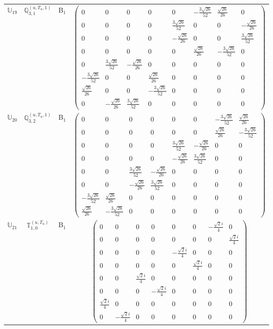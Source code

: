 \documentclass[fleqn,10pt,landscape]{article}
\begin{document}
\begin{itemize}
\begin{center}
\begin{longtable}{c|c|c|c}
$ \mathbb{U}_{19} $ & $\mathbb{Q}_{3,1}^{(u,T_{u},1)}$ & B$_{1}$ & $\begin{pmatrix} 0 & 0 & 0 & 0 & 0 & - \frac{3 \sqrt{26}}{52} & \frac{\sqrt{26}}{26} & 0 \\ 0 & 0 & 0 & 0 & \frac{3 \sqrt{26}}{52} & 0 & 0 & - \frac{\sqrt{26}}{26} \\ 0 & 0 & 0 & 0 & - \frac{\sqrt{26}}{26} & 0 & 0 & \frac{3 \sqrt{26}}{52} \\ 0 & 0 & 0 & 0 & 0 & \frac{\sqrt{26}}{26} & - \frac{3 \sqrt{26}}{52} & 0 \\ 0 & \frac{3 \sqrt{26}}{52} & - \frac{\sqrt{26}}{26} & 0 & 0 & 0 & 0 & 0 \\ - \frac{3 \sqrt{26}}{52} & 0 & 0 & \frac{\sqrt{26}}{26} & 0 & 0 & 0 & 0 \\ \frac{\sqrt{26}}{26} & 0 & 0 & - \frac{3 \sqrt{26}}{52} & 0 & 0 & 0 & 0 \\ 0 & - \frac{\sqrt{26}}{26} & \frac{3 \sqrt{26}}{52} & 0 & 0 & 0 & 0 & 0 \end{pmatrix}$ \\
$ \mathbb{U}_{20} $ & $\mathbb{Q}_{3,2}^{(u,T_{u},1)}$ & B$_{1}$ & $\begin{pmatrix} 0 & 0 & 0 & 0 & 0 & 0 & - \frac{3 \sqrt{26}}{52} & \frac{\sqrt{26}}{26} \\ 0 & 0 & 0 & 0 & 0 & 0 & \frac{\sqrt{26}}{26} & - \frac{3 \sqrt{26}}{52} \\ 0 & 0 & 0 & 0 & \frac{3 \sqrt{26}}{52} & - \frac{\sqrt{26}}{26} & 0 & 0 \\ 0 & 0 & 0 & 0 & - \frac{\sqrt{26}}{26} & \frac{3 \sqrt{26}}{52} & 0 & 0 \\ 0 & 0 & \frac{3 \sqrt{26}}{52} & - \frac{\sqrt{26}}{26} & 0 & 0 & 0 & 0 \\ 0 & 0 & - \frac{\sqrt{26}}{26} & \frac{3 \sqrt{26}}{52} & 0 & 0 & 0 & 0 \\ - \frac{3 \sqrt{26}}{52} & \frac{\sqrt{26}}{26} & 0 & 0 & 0 & 0 & 0 & 0 \\ \frac{\sqrt{26}}{26} & - \frac{3 \sqrt{26}}{52} & 0 & 0 & 0 & 0 & 0 & 0 \end{pmatrix}$ \\
$ \mathbb{U}_{21} $ & $\mathbb{T}_{1,0}^{(u,T_{u})}$ & B$_{1}$ & $\begin{pmatrix} 0 & 0 & 0 & 0 & 0 & 0 & - \frac{\sqrt{2} i}{4} & 0 \\ 0 & 0 & 0 & 0 & 0 & 0 & 0 & \frac{\sqrt{2} i}{4} \\ 0 & 0 & 0 & 0 & - \frac{\sqrt{2} i}{4} & 0 & 0 & 0 \\ 0 & 0 & 0 & 0 & 0 & \frac{\sqrt{2} i}{4} & 0 & 0 \\ 0 & 0 & \frac{\sqrt{2} i}{4} & 0 & 0 & 0 & 0 & 0 \\ 0 & 0 & 0 & - \frac{\sqrt{2} i}{4} & 0 & 0 & 0 & 0 \\ \frac{\sqrt{2} i}{4} & 0 & 0 & 0 & 0 & 0 & 0 & 0 \\ 0 & - \frac{\sqrt{2} i}{4} & 0 & 0 & 0 & 0 & 0 & 0 \end{pmatrix}$ \\

\end{longtable}
\end{center}
\end{itemize}
\end{document}
